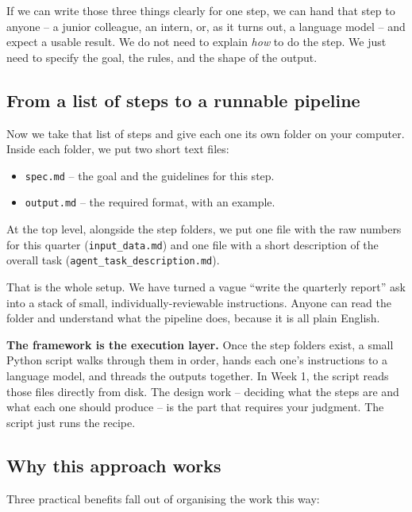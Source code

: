 \documentclass[12pt, a4paper]{article}
\begin{document}
If we can write those three things clearly for one step, we can hand that step to anyone -- a junior colleague, an intern, or, as it turns out, a language model -- and expect a usable result. We do not need to explain \textit{how} to do the step. We just need to specify the goal, the rules, and the shape of the output.

\subsection{From a list of steps to a runnable pipeline}

Now we take that list of steps and give each one its own folder on your computer. Inside each folder, we put two short text files:

\begin{itemize}[leftmargin=1.5em]
  \item \texttt{spec.md} -- the goal and the guidelines for this step.
  \item \texttt{output.md} -- the required format, with an example.
\end{itemize}

At the top level, alongside the step folders, we put one file with the raw numbers for this quarter (\texttt{input\_data.md}) and one file with a short description of the overall task (\texttt{agent\_task\_description.md}).

That is the whole setup. We have turned a vague ``write the quarterly report'' ask into a stack of small, individually-reviewable instructions. Anyone can read the folder and understand what the pipeline does, because it is all plain English.

\begin{notebox}
\textbf{The framework is the execution layer.} Once the step folders exist, a small Python script walks through them in order, hands each one's instructions to a language model, and threads the outputs together. In Week 1, the script reads those files directly from disk. The design work -- deciding what the steps are and what each one should produce -- is the part that requires your judgment. The script just runs the recipe.
\end{notebox}

\subsection{Why this approach works}

Three practical benefits fall out of organising the work this way:
\end{document}
